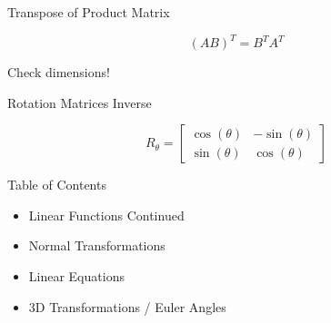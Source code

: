 \documentclass{beamer}
\begin{document}
\begin{frame}{Transpose of Product Matrix}

\[ (AB)^T = B^TA^T \]

Check dimensions!

\end{frame}


\begin{frame}{Rotation Matrices Inverse}

\[ R_{\theta} = \left[ \begin{array}{cc} \cos(\theta) & -\sin(\theta)\\ \sin(\theta) & \cos(\theta) \end{array} \right] \]



\end{frame}


\begin{frame}{Table of Contents}

\begin{itemize}[label=$\vartriangleright$]
	\item Linear Functions Continued
\end{itemize}
\begin{itemize}[label=$\blacktriangleright$]
	\item Normal Transformations
\end{itemize}
\begin{itemize}[label=$\vartriangleright$]
    \item Linear Equations
    \item 3D Transformations / Euler Angles
\end{itemize}

\end{frame}
\end{document}
